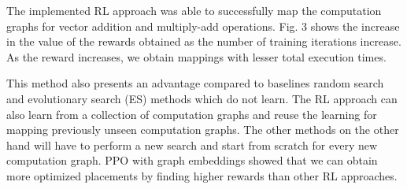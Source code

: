 The implemented RL approach was able to successfully map the computation graphs for vector addition and multiply-add operations. 
Fig. 3 shows the increase in the value of the rewards obtained as the number of training iterations increase. 
As the reward increases, we obtain mappings with lesser total execution times. 

This method also presents an advantage compared to baselines random search and evolutionary search (ES) methods which do not learn. 
The RL approach can also learn from a collection of computation graphs and reuse the learning for mapping previously unseen computation graphs. 
The other methods on the other hand will have to perform a new search and start from scratch for every new computation graph. 
PPO with graph embeddings showed that we can obtain more optimized placements by finding higher rewards than other RL approaches. 